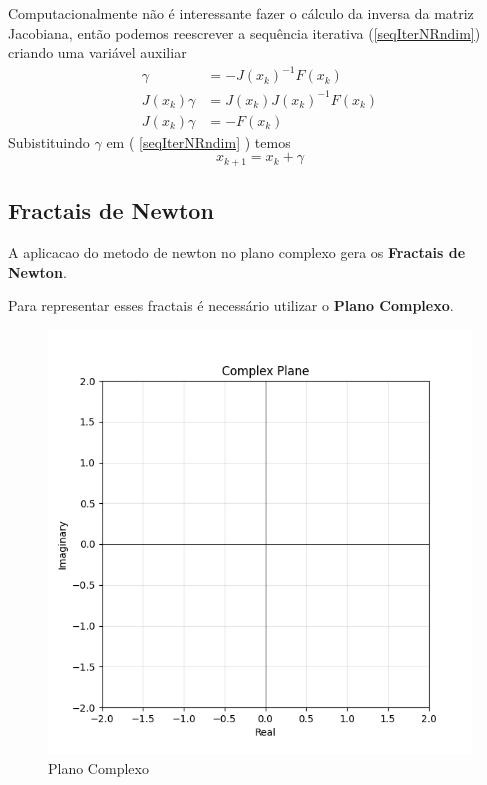 Computacionalmente não é interessante fazer o cálculo da inversa da matriz Jacobiana, então podemos reescrever a sequência iterativa (\ref{seqIterNRndim}) criando uma variável auxiliar
\begin{align*}
    \gamma &= - J(x_k)^{-1} F(x_k) \\
    J(x_k) \gamma &= J(x_k) J(x_k)^{-1} F(x_k) \\
    J(x_k) \gamma &= - F(x_k) \label{auxNRndim}
\end{align*}
Subistituindo $\gamma$ em ( \ref{seqIterNRndim} ) temos
\begin{equation*}
    x_{k+1} = x_k + \gamma
\end{equation*}


\subsection{Fractais de Newton}
A aplicacao do metodo de newton no plano complexo gera os \textbf{Fractais de Newton}.

Para representar esses fractais é necessário utilizar o \textbf{Plano Complexo}.

\begin{figure}[H]
    \centering
    \includegraphics[width=1\textwidth]{Imagens/complexPlane/complex_plane_axes.png}
    \caption{Plano Complexo}
    \label{fig:complexPlane}
\end{figure}

